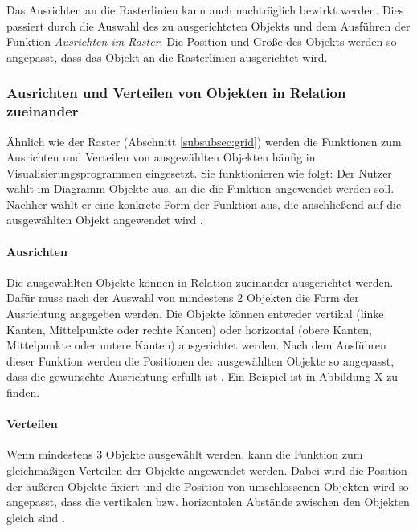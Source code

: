 Das Ausrichten an die Rasterlinien kann auch nachträglich bewirkt werden. Dies passiert durch die Auswahl des zu ausgerichteten Objekts und dem Ausführen der Funktion \textit{Ausrichten im Raster}. Die Position und Größe des Objekts werden so angepasst, dass das Objekt an die Rasterlinien ausgerichtet wird.

\subsubsection{Ausrichten und Verteilen von Objekten in Relation zueinander}
\label{subsubsec:alignment-and-distribution}

Ähnlich wie der Raster (Abschnitt \ref{subsubsec:grid}) werden die Funktionen zum Ausrichten und Verteilen von ausgewählten Objekten häufig in Visualisierungsprogrammen eingesetzt. Sie funktionieren wie folgt: Der Nutzer wählt im Diagramm Objekte aus, an die die Funktion angewendet werden soll. Nachher wählt er eine konkrete Form der Funktion aus, die anschließend auf die ausgewählten Objekt angewendet wird \cite{11Keynote}.

\paragraph{Ausrichten}

Die ausgewählten Objekte können in Relation zueinander ausgerichtet werden. Dafür muss nach der Auswahl von mindestens 2 Objekten die Form der Ausrichtung angegeben werden. Die Objekte können entweder vertikal (linke Kanten, Mittelpunkte oder rechte Kanten) oder horizontal (obere Kanten, Mittelpunkte oder untere Kanten) ausgerichtet werden. Nach dem Ausführen dieser Funktion werden die Positionen der ausgewählten Objekte so angepasst, dass die gewünschte Ausrichtung erfüllt ist \cite{11Keynote, 08OmniGraffle}. Ein Beispiel ist in Abbildung X zu finden.


\paragraph{Verteilen}

Wenn mindestens 3 Objekte ausgewählt werden, kann die Funktion zum gleichmäßigen Verteilen der Objekte angewendet werden. Dabei wird die Position der äußeren Objekte fixiert und die Position von umschlossenen Objekten wird so angepasst, dass die vertikalen bzw. horizontalen Abstände zwischen den Objekten gleich sind \cite{11Keynote}.

